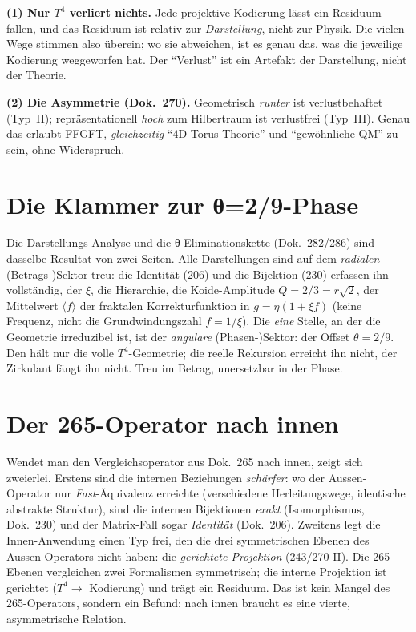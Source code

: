 \begin{important}
\textbf{(1) Nur $T^4$ verliert nichts.} Jede projektive Kodierung lässt ein Residuum fallen, und
das Residuum ist relativ zur \emph{Darstellung}, nicht zur Physik. Die vielen Wege stimmen also
überein; wo sie abweichen, ist es genau das, was die jeweilige Kodierung weggeworfen hat. Der
\enquote{Verlust} ist ein Artefakt der Darstellung, nicht der Theorie.

\textbf{(2) Die Asymmetrie (Dok.~270).} Geometrisch \emph{runter} ist verlustbehaftet (Typ~II);
repräsentationell \emph{hoch} zum Hilbertraum ist verlustfrei (Typ~III). Genau das erlaubt FFGFT,
\emph{gleichzeitig} \enquote{$4$D-Torus-Theorie} und \enquote{gewöhnliche QM} zu sein, ohne
Widerspruch.
\end{important}

\section{Die Klammer zur θ=2/9-Phase}
Die Darstellungs-Analyse und die θ-Eliminationskette (Dok.~282/286) sind dasselbe Resultat von
zwei Seiten. Alle Darstellungen sind auf dem \emph{radialen} (Betrags-)Sektor treu: die Identität
(206) und die Bijektion (230) erfassen ihn vollständig, der $\xi$, die Hierarchie, die
Koide-Amplitude $Q=2/3=r\sqrt2$, der Mittelwert $\langle f\rangle$ der fraktalen Korrekturfunktion in
$g=\eta(1+\xi f)$ (keine Frequenz, nicht die Grundwindungszahl $f=1/\xi$). Die \emph{eine} Stelle, an der
die Geometrie irreduzibel ist, ist der \emph{angulare} (Phasen-)Sektor: der Offset $\theta=2/9$.
Den hält nur die volle $T^4$-Geometrie; die reelle Rekursion erreicht ihn nicht, der Zirkulant
fängt ihn nicht. Treu im Betrag, unersetzbar in der Phase.

\section{Der 265-Operator nach innen}\label{sec:innen}
Wendet man den Vergleichsoperator aus Dok.~265 nach innen, zeigt sich zweierlei. Erstens sind die
internen Beziehungen \emph{schärfer}: wo der Aussen-Operator nur \emph{Fast}-Äquivalenz erreichte
(verschiedene Herleitungswege, identische abstrakte Struktur), sind die internen Bijektionen
\emph{exakt} (Isomorphismus, Dok.~230) und der Matrix-Fall sogar \emph{Identität} (Dok.~206).
Zweitens legt die Innen-Anwendung einen Typ frei, den die drei symmetrischen Ebenen des
Aussen-Operators nicht haben: die \emph{gerichtete Projektion} (243/270-II). Die 265-Ebenen
vergleichen zwei Formalismen symmetrisch; die interne Projektion ist gerichtet ($T^4 \to$ Kodierung)
und trägt ein Residuum. Das ist kein Mangel des 265-Operators, sondern ein Befund: nach innen
braucht es eine vierte, asymmetrische Relation.


